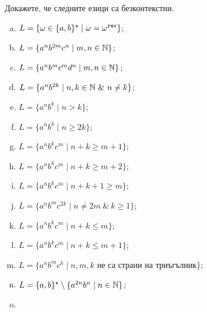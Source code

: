 \begin{extra}
\begin{problem}
  Докажете, че следните езици са безконтекстни.
  \begin{enumerate}[a)]
  \item
    $L = \{\omega \in \{a,b\}^\star \mid \omega = \omega^{\texttt{rev}}\}$;
  \item
    $L = \{a^nb^{2m}c^{n} \mid m,n \in \mathbb{N}\}$;
  \item
    $L = \{a^nb^{m}c^{m}d^n \mid m,n \in \mathbb{N}\}$;
  \item
    $L = \{a^nb^{2k} \mid n,k \in \Nat\ \&\ n \neq k\}$;
  \item
    $L = \{a^nb^k \mid n > k\}$;
  \item
    $L = \{a^nb^k \mid n \geq 2k\}$;
  \item
    $L = \{a^nb^kc^m \mid n + k \geq m+1\}$;
  \item
    $L = \{a^nb^kc^m \mid n + k \geq m+2\}$;
  \item
    $L = \{a^nb^kc^m \mid n + k + 1 \geq m\}$;
  \item
    $L = \{a^nb^mc^{2k} \mid n \neq 2m\ \&\ k \geq 1\}$;
  \item
    $L = \{a^nb^kc^m \mid n + k \leq m\}$;
  \item
    $L = \{a^nb^kc^m \mid n + k \leq m+1\}$;
  \item
    $L = \{a^nb^mc^k \mid n, m, k \text{ не са страни на триъгълник}\}$;
  \item
    $L = \{a,b\}^\star \setminus \{a^{2n}b^n \mid n\in\mathbb{N}\}$;
  \item

\end{enumerate}
\end{problem}
\end{extra}
